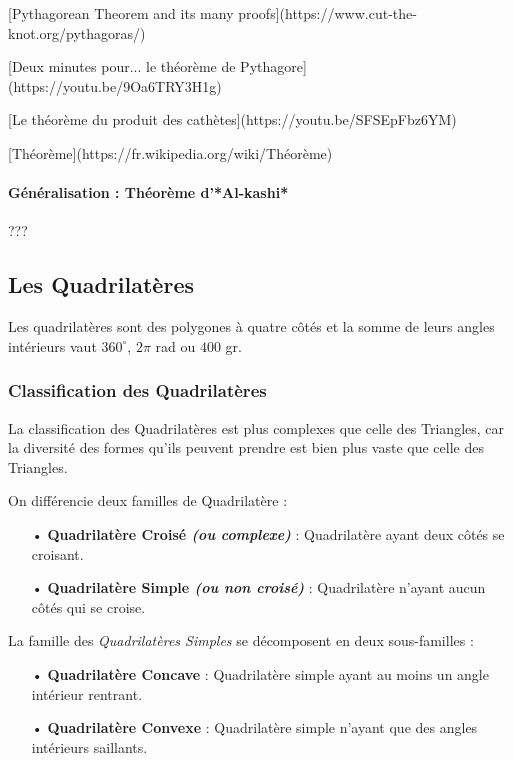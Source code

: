 \documentclass[a4paper, twoside]{article}
\begin{document}
	[Pythagorean Theorem and its many proofs](https://www.cut-the-knot.org/pythagoras/)

[Deux minutes pour... le théorème de Pythagore](https://youtu.be/9Oa6TRY3H1g)

[Le théorème du produit des cathètes](https://youtu.be/SFSEpFbz6YM)

[Théorème](https://fr.wikipedia.org/wiki/Théorème)


\paragraph*{Généralisation : Théorème d'*Al-kashi*}
???


\newpage

\subsection{Les Quadrilatères} \label{quadrilateres}

Les quadrilatères sont des polygones à quatre côtés et la somme de leurs angles
intérieurs vaut $360^\circ$, $2 \pi$ rad ou $400$ gr.

\subsubsection{Classification des Quadrilatères}

La classification des Quadrilatères est plus complexes que celle
des Triangles, car la diversité des formes qu'ils peuvent prendre
est bien plus vaste que celle des Triangles.

\medbreak

On différencie deux familles de Quadrilatère :

\begin{itemize}
	\item[•] \textbf{Quadrilatère Croisé \textit{(ou complexe)}} : Quadrilatère ayant deux côtés se croisant.
	\item[•] \textbf{Quadrilatère Simple \textit{(ou non croisé)}} : Quadrilatère n'ayant aucun côtés qui se croise.
\end{itemize}

\bigbreak

La famille des \emph{Quadrilatères Simples} se décomposent en deux sous-familles :

\begin{itemize}
	\item[•] \textbf{Quadrilatère Concave} : Quadrilatère simple ayant au moins un angle intérieur rentrant.
	\item[•] \textbf{Quadrilatère Convexe} : Quadrilatère simple n'ayant que des angles intérieurs saillants.
\end{itemize}
\end{document}
